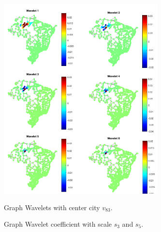 \begin{figure}[h]
	\centering
    {
		\includegraphics[width= 3.3in] {figures/brazil_wavelet_small.png}
	}
	\caption{Graph Wavelets with center city $v_{83}$.}
	\label{fig:brazil_wavelet_small}
\end{figure}




\begin{figure}[th]
	\centering
	\caption{Graph Wavelet coefficient with scale $s_3$ and $s_5$.}
	\label{fig:graphwaveletcoefficient}
\end{figure}


